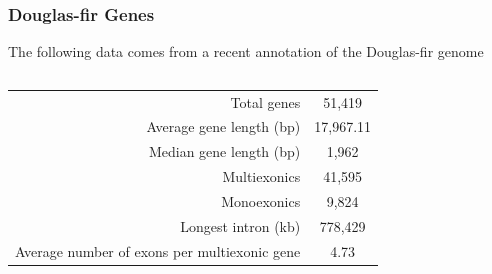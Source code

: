 \documentclass{beamer}
\begin{document}
\begin{frame}
	\frametitle{Douglas-fir Genes}
	\scriptsize
	The following data comes from a recent annotation of the Douglas-fir genome
	\vspace{10pt}

	\begin{columns}
		\begin{column}{0.7\textwidth}
			\begin{tabular}{r|c}
				Total genes	& 51,419\\
				Average gene length (bp) & 17,967.11\\
				Median gene length (bp) & 1,962 \\
				Multiexonics & 41,595\\
				Monoexonics & 9,824\\
				Longest intron (kb) & 778,429\\
				Average number of exons per multiexonic gene& 4.73\\
				

\end{tabular}
\end{column}
\end{columns}
\end{frame}
\end{document}
